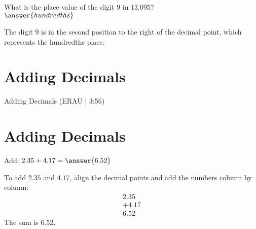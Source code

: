 \documentclass{ximera}
\begin{document}
\begin{problem}
What is the place value of the digit $9$ in $13.095$?\\
$\answer{hundredths}$
\begin{feedback}
The digit $9$ is in the second position to the right of the decimal point, which represents the hundredths place.
\end{feedback}
\end{problem}

\section*{Adding Decimals}

Adding Decimals (ERAU | 3:56)



\section*{Adding Decimals}

\begin{problem}
Add: $2.35 + 4.17 = \answer{6.52}$
\begin{feedback}
To add $2.35$ and $4.17$, align the decimal points and add the numbers column by column:
\begin{align*}
  2.35 \\
+ 4.17 \\
\hline
  6.52
\end{align*}
The sum is $6.52$.
\end{feedback}
\end{problem}
\end{document}
